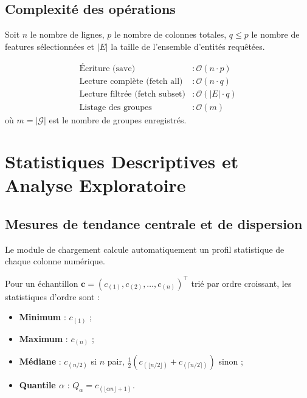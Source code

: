 \documentclass[12pt,a4paper]{article}
\newcounter{defcount}[section]
\newcounter{propcount}[section]
\newenvironment{definition}[1]{%
  \stepcounter{defcount}%
  \begin{tcolorbox}[defstyle={Définition \thesection.\thedefcount\ — #1}]
}{%
  \end{tcolorbox}
}
\newenvironment{proposition}[1]{%
  \stepcounter{propcount}%
  \begin{tcolorbox}[propstyle={Proposition \thesection.\thepropcount\ — #1}]
}{%
  \end{tcolorbox}
}
\begin{document}
\subsection{Complexité des opérations}

Soit $n$ le nombre de lignes, $p$ le nombre de colonnes totales,
$q \leq p$ le nombre de features sélectionnées et $|E|$ la taille de l'ensemble
d'entités requêtées.

\begin{proposition}{Complexité des opérations du Feature Store}
\begin{align}
  \text{Écriture (save)} &: \mathcal{O}(n \cdot p) \\
  \text{Lecture complète (fetch all)} &: \mathcal{O}(n \cdot q) \\
  \text{Lecture filtrée (fetch subset)} &: \mathcal{O}(|E| \cdot q) \\
  \text{Listage des groupes} &: \mathcal{O}(m)
\end{align}
où $m = |\mathcal{G}|$ est le nombre de groupes enregistrés.
\end{proposition}

\section{Statistiques Descriptives et Analyse Exploratoire}

\subsection{Mesures de tendance centrale et de dispersion}

Le module de chargement calcule automatiquement un profil statistique de chaque
colonne numérique.

\begin{definition}{Statistiques d'ordre}
Pour un échantillon $\mathbf{c} = (c_{(1)}, c_{(2)}, \ldots, c_{(n)})^{\top}$
trié par ordre croissant, les statistiques d'ordre sont :
\begin{itemize}
  \item \textbf{Minimum} : $c_{(1)}$ ;
  \item \textbf{Maximum} : $c_{(n)}$ ;
  \item \textbf{Médiane} : $c_{(n/2)}$ si $n$ pair,
    $\frac{1}{2}(c_{(\lfloor n/2 \rfloor)} + c_{(\lceil n/2 \rceil)})$ sinon ;
  \item \textbf{Quantile $\alpha$} :
    $Q_\alpha = c_{(\lfloor \alpha n \rfloor + 1)}$.
\end{itemize}
\end{definition}
\end{document}
